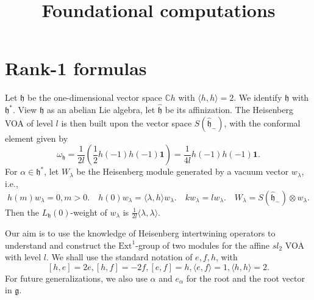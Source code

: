 \documentclass[11pt,oneside,reqno]{amsart}
\theoremstyle{definition}
\newcommand{\C}{{\mathbb C}}
\newcommand{\h}{{\mathfrak h}}
\newcommand{\g}{{\mathfrak g}}
\newcommand{\one}{\mathbf{1}}
\begin{document}
\setlength{\oddsidemargin}{0cm} \setlength{\evensidemargin}{0cm}
\baselineskip=18pt


\title{Foundational computations}


\maketitle

\section{Rank-1 formulas}

Let $\mathfrak{h}$ be the one-dimensional vector space $\C h$ with $\langle h, h\rangle = 2$. We identify $\mathfrak{h}$ with $\mathfrak{h}^*$. View $\mathfrak{h}$ as an abelian Lie algebra, let $\hat{\mathfrak{h}}$ be its affinization. The Heisenberg VOA of level $l$ is then built upon the vector space $S(\hat\h_-)$, with the conformal element given by 
$$\omega_\h = \frac 1 {2l} \left(\frac 1 2 h(-1)h(-1)\one
\right) = \frac 1 {4l} h(-1)h(-1)\one.$$
For $\alpha\in \h^*$, let $W_\lambda$ be the Heisenberg module generated by a  vacuum vector $w_\lambda$, i.e., 
$$h(m)w_\lambda =0, m>0. \quad h(0) w_\lambda = \langle \lambda, h\rangle w_\lambda. \quad k w_\lambda = l w_\lambda. \quad W_\lambda = S(\hat\h_-)\otimes w_\lambda. $$
Then the $L_\h(0)$-weight of $w_\lambda$ is $\frac 1 {2l}\langle \lambda, \lambda\rangle.$

Our aim is to use the knowledge of Heisenberg intertwining operators to understand and construct the $\text{Ext}^1$-group of two modules for the affine $sl_2$ VOA with level $l$. We shall use the standard notation of $e,f,h$, with 
$$[h,e]=2e,[h,f]=-2f,[e,f]=h,\langle e,f\rangle = 1, \langle h, h\rangle = 2. $$
For future generalizations, we also use $\alpha$ and $e_\alpha$ for the root and the root vector in $\g$. 
\end{document}
